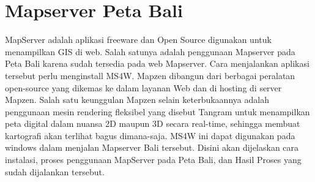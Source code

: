 \section{Mapserver Peta Bali}
MapServer  adalah aplikasi freeware dan Open Source digunakan untuk  menampilkan GIS di web. Salah satunya adalah penggunaan Mapserver pada Peta Bali karena sudah tersedia pada web Mapserver. Cara menjalankan aplikasi tersebut perlu menginstall MS4W.
Mapzen dibangun dari berbagai peralatan open-source yang dikemas ke dalam layanan Web dan di hosting di server Mapzen. Salah satu keunggulan Mapzen selain keterbukaannya adalah penggunaan mesin rendering fleksibel yang disebut Tangram untuk menampilkan peta digital dalam nuansa 2D maupun 3D secara real-time, sehingga membuat kartografi akan terlihat bagus dimana-saja.
MS4W ini dapat digunakan pada windows dalam menjalan Mapserver Bali tersebut. Disini akan dijelaskan cara instalasi, proses penggunaan MapServer pada Peta Bali, dan Hasil Proses yang sudah dijalankan tersebut.

